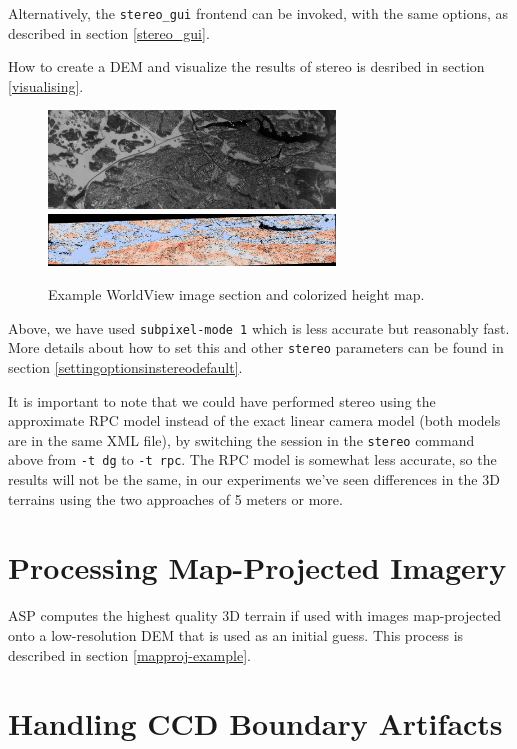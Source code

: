 Alternatively, the \texttt{stereo\_gui} frontend can be invoked, with
the same options, as described in section \ref{stereo_gui}.

How to create a DEM and visualize the results of stereo is desribed in section
\ref{visualising}.

\begin{figure}[h!]
\centering
  \includegraphics[width=3.0in]{images/examples/dg/wv_tutorial_input.png}
  \includegraphics[width=3.0in]{images/examples/dg/wv_tutorial_colormap.png}
\caption{Example WorldView image section and colorized height map.}
\label{fig:dg-nomap-example}
\end{figure}

Above, we have used \texttt{subpixel-mode 1} which is less accurate but
reasonably fast.  More details about how to set this and other
\texttt{stereo} parameters can be found in section
\ref{settingoptionsinstereodefault}.

It is important to note that we could have performed stereo using the
approximate RPC model instead of the exact linear camera model (both
models are in the same XML file), by switching the session in the
\texttt{stereo} command above from \texttt{-t dg} to \texttt{-t
rpc}. The RPC model is somewhat less accurate, so the results will not
be the same, in our experiments we've seen differences in the 3D
terrains using the two approaches of 5 meters or more.

\section{Processing Map-Projected Imagery}
\label{mapproj}

ASP computes the highest quality 3D terrain if used with images map-projected
onto a low-resolution DEM that is used as an initial guess. This process
is described in section \ref{mapproj-example}.

\section{Handling CCD Boundary Artifacts}
\label{wvcorrect-example}


